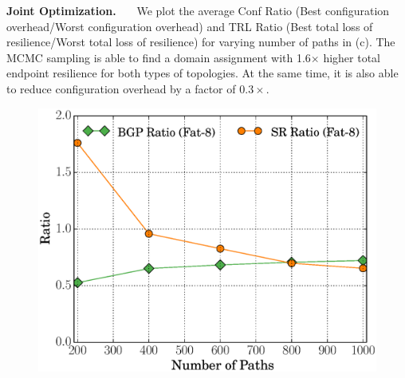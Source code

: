 \noindent\textbf{Joint Optimization.}~~~
We plot the average Conf Ratio 
(Best configuration overhead/Worst configuration overhead) and TRL
Ratio (Best total loss of resilience/Worst total loss of resilience)
for varying number of paths in (c). The MCMC
sampling is able to find a domain assignment
with 1.6$\times$ higher total endpoint resilience for both types
of topologies. At the same time, it is also able to reduce configuration
overhead by a factor of $0.3\times$. 
\begin{figure}[!t]
	\centering
	{\includegraphics[width=0.33\columnwidth]{figures/ratioMCMC.eps}}
\end{figure}

